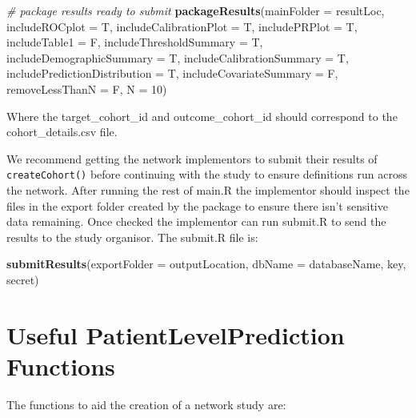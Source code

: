 \documentclass[
]{article}
\newenvironment{Shaded}{\begin{snugshade}}{\end{snugshade}}
\newcommand{\CommentTok}[1]{\textcolor[rgb]{0.56,0.35,0.01}{\textit{#1}}}
\newcommand{\DataTypeTok}[1]{\textcolor[rgb]{0.13,0.29,0.53}{#1}}
\newcommand{\DecValTok}[1]{\textcolor[rgb]{0.00,0.00,0.81}{#1}}
\newcommand{\KeywordTok}[1]{\textcolor[rgb]{0.13,0.29,0.53}{\textbf{#1}}}
\newcommand{\NormalTok}[1]{#1}
\begin{document}
\begin{Shaded}
\begin{Highlighting}[]
\CommentTok{# package results ready to submit}
\KeywordTok{packageResults}\NormalTok{(}\DataTypeTok{mainFolder =}\NormalTok{ resultLoc, }\DataTypeTok{includeROCplot =}\NormalTok{ T, }\DataTypeTok{includeCalibrationPlot =}\NormalTok{ T, }\DataTypeTok{includePRPlot =}\NormalTok{ T, }
    \DataTypeTok{includeTable1 =}\NormalTok{ F, }\DataTypeTok{includeThresholdSummary =}\NormalTok{ T, }\DataTypeTok{includeDemographicSummary =}\NormalTok{ T, }\DataTypeTok{includeCalibrationSummary =}\NormalTok{ T, }
    \DataTypeTok{includePredictionDistribution =}\NormalTok{ T, }\DataTypeTok{includeCovariateSummary =}\NormalTok{ F, }\DataTypeTok{removeLessThanN =}\NormalTok{ F, }\DataTypeTok{N =} \DecValTok{10}\NormalTok{)}
\end{Highlighting}
\end{Shaded}

Where the target\_cohort\_id and outcome\_cohort\_id should correspond
to the cohort\_details.csv file.

We recommend getting the network implementors to submit their results of
\texttt{createCohort()} before continuing with the study to ensure
definitions run across the network. After running the rest of main.R the
implementor should inspect the files in the export folder created by the
package to ensure there isn't sensitive data remaining. Once checked the
implementor can run submit.R to send the results to the study organisor.
The submit.R file is:

\begin{Shaded}
\begin{Highlighting}[]
\KeywordTok{submitResults}\NormalTok{(}\DataTypeTok{exportFolder =}\NormalTok{ outputLocation, }\DataTypeTok{dbName =}\NormalTok{ databaseName, key, secret)}
\end{Highlighting}
\end{Shaded}

\hypertarget{useful-patientlevelprediction-functions}{%
\section{Useful PatientLevelPrediction
Functions}\label{useful-patientlevelprediction-functions}}

The functions to aid the creation of a network study are:
\end{document}
